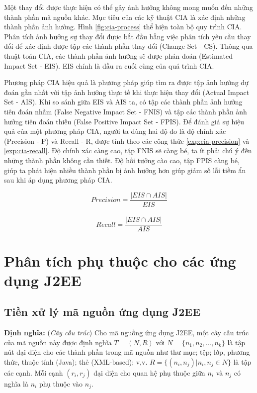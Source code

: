 \documentclass[12pt]{report}
\begin{document}
Một thay đổi được thực hiện có thể gây ảnh hưởng không mong muốn đến những thành phần mã nguồn khác. Mục tiêu của các kỹ thuật CIA là xác định những thành phần ảnh hưởng. Hình \ref{fig:cia-process} thể hiện toàn bộ quy trình CIA. Phân tích ảnh hưởng sự thay đổi được bắt đầu bằng việc phân tích yêu cầu thay đổi để xác định được tập các thành phần thay đổi (Change Set - CS). Thông qua thuật toán CIA, các thành phần ảnh hưởng sẽ được phán đoán (Estimated Impact Set - EIS). EIS chính là đầu ra cuối cùng của quá trình CIA.

Phương pháp CIA hiệu quả là phương pháp giúp tìm ra được tập ảnh hưởng dự đoán gần nhất với tập ảnh hưởng thực tế khi thực hiện thay đổi (Actual Impact Set - AIS). Khi so sánh giữa EIS và AIS ta, có tập các thành phần ảnh hưởng tiên đoán nhầm (False Negative Impact Set - FNIS) và tập các thành phần ảnh hưởng tiên đoán thiếu (False Positive Impact Set - FPIS). Để đánh giá sự hiệu quả của một phương pháp CIA, người ta dùng hai độ đo là độ chính xác (Precision - P) và Recall - R, được tính theo các công thức \ref{exp:cia-precision} và \ref{exp:cia-recall}. Độ chính xác càng cao, tập FNIS sẽ càng bé, ta ít phải chú ý đến những thành phần không cần thiết. Độ hồi tưởng cào cao, tập FPIS càng bé, giúp ta phát hiện nhiều thành phần bị ảnh hưởng hơn giúp giảm số lỗi tiềm ẩn sau khi áp dụng phương pháp CIA.

\begin{equation}
	Precision = \frac{|EIS \cap AIS|}{EIS}
	\label{exp:cia-precision}
\end{equation}
\\
\begin{equation}
	Recall = \frac{|EIS \cap AIS|}{AIS}
	\label{exp:cia-recall}
\end{equation}

\newpage
\chapter{Phân tích phụ thuộc cho các ứng dụng J2EE}
\section{Tiền xử lý mã nguồn ứng dụng J2EE}
\textbf{Định nghĩa:} (\textit{Cây cấu trúc}) Cho mã nguồng ứng dụng J2EE, một cây cấu trúc của mã nguồn này được định nghĩa $T = (N, R)$ với $N = \{n_1, n_2,..., n_k\}$ là tập nút đại diện cho các thành phần trong mã nguồn như thư mục; tệp; lớp, phương thức, thuộc tính (Java); thẻ (XML-based); v,v. $R = \{(n_i, n_j) | n_i,n_j \in N\}$ là tập các cạnh. Mỗi cạnh $(r_i,r_j)$ đại diện cho quan hệ phụ thuộc giữa $n_i$ và $n_j$ có nghĩa là $n_i$ phụ thuộc vào $n_j$.
\end{document}
